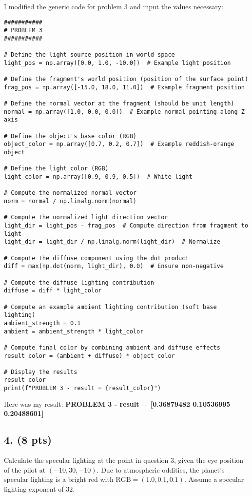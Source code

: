 \documentclass{article}
\begin{document}
I modified the generic code for problem 3 and input the values necessary:
\begin{verbatim}
###########
# PROBLEM 3
###########

# Define the light source position in world space
light_pos = np.array([0.0, 1.0, -10.0])  # Example light position

# Define the fragment's world position (position of the surface point)
frag_pos = np.array([-15.0, 18.0, 11.0])  # Example fragment position

# Define the normal vector at the fragment (should be unit length)
normal = np.array([1.0, 0.0, 0.0])  # Example normal pointing along Z-axis

# Define the object's base color (RGB)
object_color = np.array([0.7, 0.2, 0.7])  # Example reddish-orange object

# Define the light color (RGB)
light_color = np.array([0.9, 0.9, 0.5])  # White light

# Compute the normalized normal vector
norm = normal / np.linalg.norm(normal)

# Compute the normalized light direction vector
light_dir = light_pos - frag_pos  # Compute direction from fragment to light
light_dir = light_dir / np.linalg.norm(light_dir)  # Normalize

# Compute the diffuse component using the dot product
diff = max(np.dot(norm, light_dir), 0.0)  # Ensure non-negative

# Compute the diffuse lighting contribution
diffuse = diff * light_color

# Compute an example ambient lighting contribution (soft base lighting)
ambient_strength = 0.1
ambient = ambient_strength * light_color

# Compute final color by combining ambient and diffuse effects
result_color = (ambient + diffuse) * object_color

# Display the results
result_color
print(f"PROBLEM 3 - result = {result_color}")
\end{verbatim}

Here was my result: \textbf{PROBLEM 3 - result = [0.36879482 0.10536995 0.20488601]}
\subsection*{4. (8 pts)}
Calculate the specular lighting at the point in question 3, given the eye position of the pilot at \((-10, 30, -10)\). Due to atmospheric oddities, the planet’s specular lighting is a bright red with \(\text{RGB} = (1.0, 0.1, 0.1)\). Assume a specular lighting exponent of \(32\).
\end{document}
